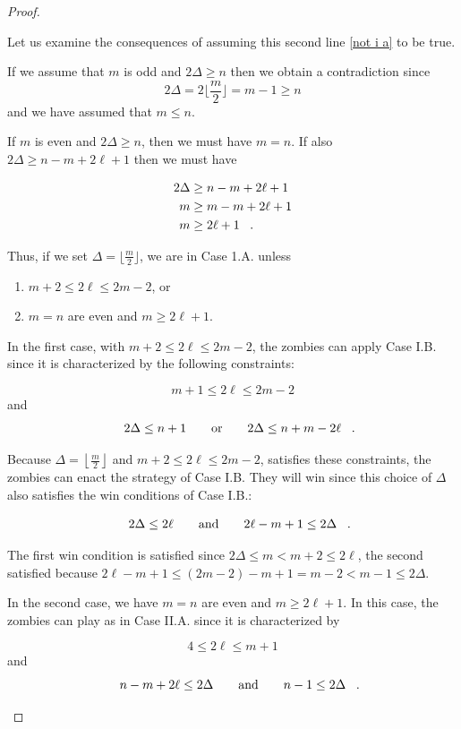 \begin{proof}
\begin{proofpart}
Let us examine the consequences of assuming this second line \ref{not i a} to be true.

If we assume that $m$ is odd and $2 \Delta \geq n$ then we obtain a contradiction since
\[ 2 \Delta = 2 \lfloor \frac{m}{2} \rfloor = m -1 \geq n \]
and we have assumed that $m \leq n$.

If $m$ is even and $2\Delta \geq n$, then we must have $m = n$. If also $2\Delta \geq n - m + 2\ell +1$ then we must have

\begin{align*}
  2 \Delta & \geq n - m + 2\ell + 1 \\
  m & \geq m - m + 2 \ell + 1 \\
  m & \geq 2 \ell + 1 \mperiod
\end{align*}

Thus, if we set $\Delta = \lfloor \frac{m}{2} \rfloor$, we are in Case 1.A. unless

\begin{enumerate}
  \item $m+2 \leq 2\ell \leq 2m-2$, or
  \item $m=n$ are even and $m \geq 2\ell +1$.
\end{enumerate}

In the first case, with $m+2 \leq 2\ell \leq 2m-2$, the zombies can apply Case I.B. since it is characterized by the following constraints:

\[ m+1 \leq 2 \ell \leq 2m -2 \]
and
\[2 \Delta \leq n +1 \qquad \text{or} \qquad 2\Delta \leq n + m - 2 \ell \mperiod \]

Because $\Delta  = \left\lfloor \frac{m}{2} \right\rfloor$ and $m+2 \leq 2\ell \leq 2m-2$, satisfies these constraints, the zombies can enact the strategy of Case I.B. They will win since this choice of $\Delta$ also satisfies the win conditions of Case I.B.:

\[ 2\Delta \leq 2 \ell \qquad \text{and} \qquad 2\ell -m+1 \leq 2\Delta \mperiod \]

The first win condition is satisfied since $2\Delta \leq m < m+2 \leq 2\ell$, the second satisfied because $2\ell -m+1 \leq (2m-2)- m+1 = m-2 < m-1 \leq 2\Delta$.

In the second case, we have $m = n$ are even and $m \geq 2\ell+1$. In this case, the zombies can play as in Case II.A. since it is characterized by

\[ 4 \leq 2 \ell \leq m + 1\]
and
\[ n -m + 2\ell \leq 2 \Delta \qquad \text{and} \qquad n-1 \leq 2 \Delta \mperiod \]


\end{proofpart}
\end{proof}
